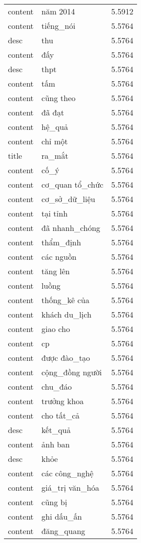 \documentclass{article}
\begin{document}
\begin{tabular}{lll}
content & năm 2014 & 5.5912\\
content & tiếng\_nói & 5.5764\\
desc & thu & 5.5764\\
content & đấy & 5.5764\\
desc & thpt & 5.5764\\
content & tấm & 5.5764\\
content & cũng theo & 5.5764\\
content & đã đạt & 5.5764\\
content & hệ\_quả & 5.5764\\
content & chỉ một & 5.5764\\
title & ra\_mắt & 5.5764\\
content & cố\_ý & 5.5764\\
content & cơ\_quan tổ\_chức & 5.5764\\
content & cơ\_sở\_dữ\_liệu & 5.5764\\
content & tại tỉnh & 5.5764\\
content & đã nhanh\_chóng & 5.5764\\
content & thẩm\_định & 5.5764\\
content & các nguồn & 5.5764\\
content & tăng lên & 5.5764\\
content & luồng & 5.5764\\
content & thống\_kê của & 5.5764\\
content & khách du\_lịch & 5.5764\\
content & giao cho & 5.5764\\
content & cp & 5.5764\\
content & được đào\_tạo & 5.5764\\
content & cộng\_đồng người & 5.5764\\
content & chu\_đáo & 5.5764\\
content & trưởng khoa & 5.5764\\
content & cho tất\_cả & 5.5764\\
desc & kết\_quả & 5.5764\\
content & ảnh ban & 5.5764\\
desc & khỏe & 5.5764\\
content & các công\_nghệ & 5.5764\\
content & giá\_trị văn\_hóa & 5.5764\\
content & cũng bị & 5.5764\\
content & ghi dấu\_ấn & 5.5764\\
content & đăng\_quang & 5.5764\\

\end{tabular}
\end{document}

